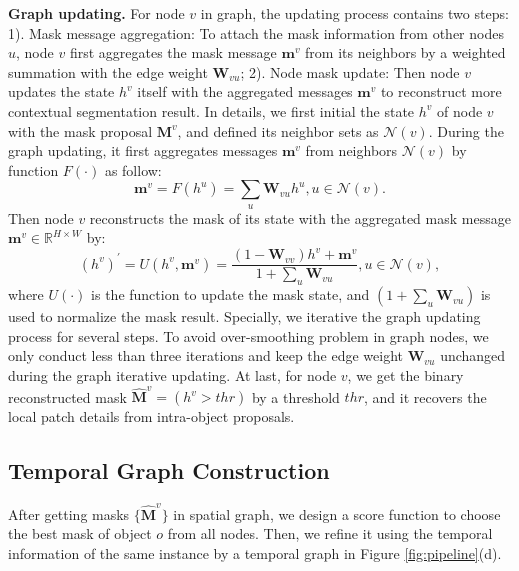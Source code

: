 \documentclass[letterpaper]{article} %
\begin{document}
\noindent \textbf{Graph updating.}
For node $v$ in graph, the updating process contains two steps: 1). Mask message aggregation: To attach the mask information from other nodes $u$, node $v$ first aggregates the mask message $\bm{m}^v$ from its neighbors by a weighted summation with the edge weight $\bm{W}_{vu}$; 2). Node mask update: Then node $v$ updates the state $h^v$ itself with the aggregated messages $\bm{m}^v$ to reconstruct more contextual segmentation result.
In details, we first initial the state $h^v$ of node $v$ with the mask proposal $\bm{M}^{v}$, and defined its neighbor sets as $\mathcal{N}(v)$. During the graph updating, it first aggregates messages $\bm{m}^v$ from neighbors $\mathcal{N}(v)$ by function $F(\cdot)$ as follow:
\begin{equation}
    \bm{m}^v = F(h^u) = \sum_u \bm{W}_{vu}h^u, u\in \mathcal{N}(v).
\end{equation}
Then node $v$ reconstructs the mask of its state with the aggregated mask message $\bm{m}^v \in \mathbb{R}^{H\times W}$ by:
\begin{equation}
    (h^v)^{'} = U(h^{v}, \bm{m}^v) = \frac{(1-\bm{W}_{vv})h^{v}+\bm{m}^v}{1+\sum_u \bm{W}_{vu}} , u\in \mathcal{N}(v),
\end{equation}
where $U(\cdot)$ is the function to update the mask state, and $(1+\sum_{u}\bm{W}_{vu})$ is used to normalize the mask result.
Specially, we iterative the graph updating process for several steps.
To avoid over-smoothing problem \cite{li2018deeper} in graph nodes, we only conduct less than three iterations and keep the edge weight $\bm{W}_{vu}$ unchanged during the graph iterative updating. 
At last, for node $v$, we get the binary reconstructed mask $\widehat{\bm{M}}^{v} = (h^v>thr)$ by a threshold $thr$, and it recovers the local patch details from intra-object proposals.

\subsection{Temporal Graph Construction}
After getting masks $\{\widehat{\bm{M}}^{v}\}$ in spatial graph, we design a score function to choose the best mask of object $o$ from all nodes. Then, we refine it using the temporal information of the same instance by a temporal graph in Figure \ref{fig:pipeline}(d).
\end{document}
